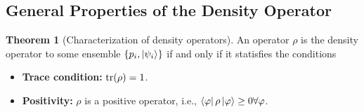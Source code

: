 \documentclass{book}
\theoremstyle{definition}
\newtheorem{thm}{Theorem}[section]
\begin{document}
\subsection{General Properties of the Density Operator}



\begin{thm}[Characterization of density operators] 
	An operator $\rho$ is the density operator to some ensemble $\{p_i, \ket{\psi_i} \}$ if and only if it statisfies the conditions
	\begin{itemize}
		\item \textbf{Trace condition:} $\tr(\rho) = 1$.
		\item \textbf{Positivity:} $\rho$ is a positive operator, i.e., $\bra{\varphi}\rho\ket{\varphi} \geq 0 \forall \varphi$.
	\end{itemize}
\end{thm}
\end{document}
